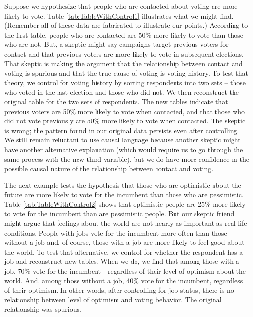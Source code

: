 \documentclass[11pt,openany]{book}\usepackage[]{graphicx}\usepackage[]{color}
\begin{document}
Suppose we hypothesize that people who are contacted about voting are more likely to vote.  Table \ref{tab:TableWithControl1} illustrates what we might find.  (Remember all of these data are fabricated to illustrate our points.)  According to the first table, people who are contacted are 50\% more likely to vote than those who are not.  But, a skeptic might say campaigns target previous voters for contact and that previous voters are more likely to vote in subsequent elections.  That skeptic is making the argument that the relationship between contact and voting is spurious and that the true cause of voting is voting history.  To test that theory, we control for voting history by sorting respondents into two sets -- those who voted in the last election and those who did not.  We then reconstruct the original table for the two sets of respondents.   The new tables indicate that previous voters are 50\% more likely to vote when contacted, and that those who did not vote previously are 50\% more likely to vote when contacted.   The skeptic is wrong; the pattern found in our original data persists even after controlling.  We still remain reluctant to use causal language because another skeptic might have another alternative explanation (which would require us to go through the same process with the new third variable), but we do have more confidence in the possible causal nature of the relationship between contact and voting.

The next example tests the hypothesis that those who are optimistic about the future are more likely to vote for the incumbent than those who are pessimistic.  Table \ref{tab:TableWithControl2} shows that optimistic people are 25\% more likely to vote for the incumbent than are pessimistic people.   But our skeptic friend might argue that feelings about the world are not nearly as important as real life conditions.  People with jobs vote for the incumbent more often than those without a job and, of course, those with a job are more likely to feel good about the world.  To test that alternative, we control for whether the respondent has a job and reconstruct new tables.  When we do, we find that among those with a job, 70\% vote for the incumbent - regardless of their level of optimism about the world.  And, among those without a job, 40\% vote for the incumbent, regardless of their optimism.  In other words, after controlling for job status, there is no relationship between level of optimism and voting behavior.  The original relationship was spurious.
\end{document}
